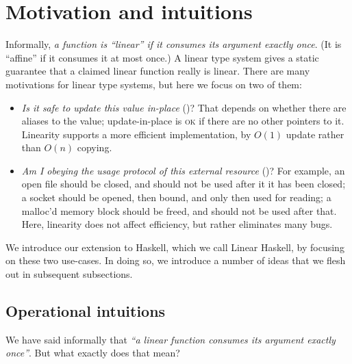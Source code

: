 \documentclass[acmsmall,screen]{acmart}\settopmatter{}
\newcommand\HaskeLL{Linear Haskell\xspace{}}
\begin{document}
\section{Motivation and intuitions}
\label{sec:programming-intro}

Informally, \emph{a function is ``linear'' if it consumes its argument exactly once}.
(It is ``affine'' if it consumes it at most once.)  A linear type system
gives a static guarantee that a claimed linear function really is linear.
There are many motivations for linear type systems, but here we focus on two of them:
\begin{itemize}
\item \emph{Is it safe to update this value in-place} ()?
That depends on whether there
are aliases to the value; update-in-place is \textsc{ok} if there are no other pointers to it.
Linearity supports a more efficient implementation, by $O(1)$ update rather than $O(n)$ copying.
\item \emph{Am I obeying the usage protocol of this external resource}
()?
For example, an open file should be closed, and should not be used after it it has been closed;
a socket should be opened, then bound, and only then used for reading; a malloc'd memory
block should be freed, and should not be used after that.
Here, linearity does not affect efficiency, but rather eliminates many bugs.
\end{itemize}
We introduce our extension to Haskell, which we call \HaskeLL{}, by
focusing on these two use-cases.  In doing so, we introduce a number
of ideas that we flesh out in subsequent subsections.

\subsection{Operational intuitions}
\label{sec:consumed}

We have said informally that \emph{``a linear function consumes its argument
exactly once''}. But what exactly does that mean?
\end{document}
